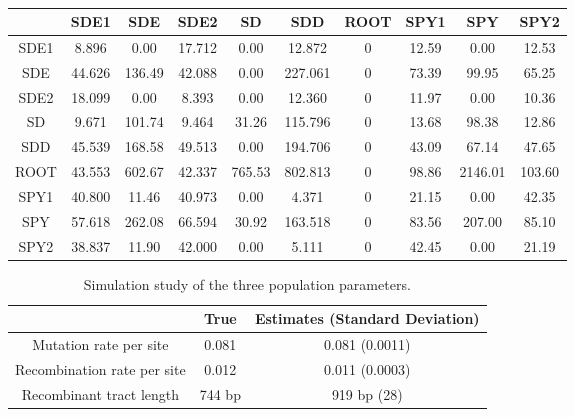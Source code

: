 \documentclass[english]{article}
\providecommand{\tabularnewline}{\\}
\begin{document}
\begin{table}
\caption{\label{tab:obsheatmap}}
\noindent \centering{}\begin{tabular}{cccccccccc}
\hline
& SDE1 & SDE & SDE2 & SD & SDD & ROOT & SPY1 & SPY & SPY2 \tabularnewline
\hline
SDE1&8.896 &  0.00 &17.712  & 0.00 & 12.872   & 0 &12.59  &  0.00  &12.53\tabularnewline
SDE &44.626& 136.49& 42.088 &  0.00& 227.061  &  0& 73.39 &  99.95 & 65.25\tabularnewline
SDE2&18.099&   0.00&  8.393 &  0.00&  12.360  &  0& 11.97 &   0.00 & 10.36\tabularnewline
SD  &9.671 &101.74 & 9.464  &31.26 &115.796   & 0 &13.68  & 98.38  &12.86\tabularnewline
SDD &45.539& 168.58& 49.513 &  0.00& 194.706  &  0& 43.09 &  67.14 & 47.65\tabularnewline
ROOT&43.553& 602.67& 42.337 &765.53& 802.813  &  0& 98.86 &2146.01 &103.60\tabularnewline
SPY1&40.800&  11.46& 40.973 &  0.00&   4.371  &  0& 21.15 &   0.00 & 42.35\tabularnewline
SPY &57.618& 262.08& 66.594 & 30.92& 163.518  &  0& 83.56 & 207.00 & 85.10\tabularnewline
SPY2&38.837&  11.90& 42.000 &  0.00&   5.111  &  0& 42.45 &   0.00 & 21.19\tabularnewline
\hline
\end{tabular}
\end{table}
\clearpage{}

\begin{table}
\caption{\label{tab:sim-three-population-parameters}
Simulation study of the three population parameters.}
\noindent \begin{centering}
\begin{tabular}{ccc}
 & True & Estimates (Standard Deviation)\tabularnewline
\hline
Mutation rate per site & 0.081 & 0.081 (0.0011)\tabularnewline
Recombination rate per site & 0.012 & 0.011 (0.0003)\tabularnewline
Recombinant tract length & 744 bp & 919 bp (28)\tabularnewline
\hline
\end{tabular}
\par\end{centering}
\end{table}
\clearpage{}
\end{document}
